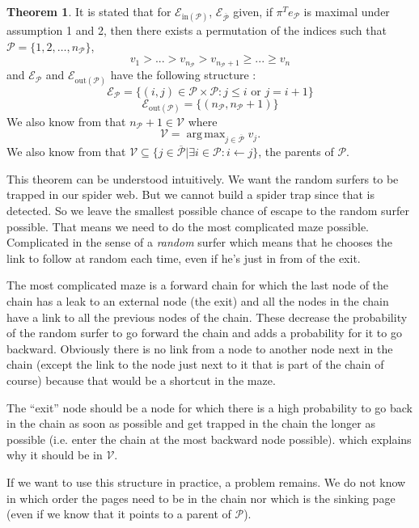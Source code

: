 \documentclass{article}
\DeclareMathOperator*{\argmax}{arg\,max}
\newcommand{\1}{\mathbf{1}}
\theoremstyle{definition}
\newtheorem{mytheo}[mydef]{Theorem}
\begin{document}
\begin{mytheo}
  It is stated that for \(\mathcal{E}_{\text{in}(\mathcal{P})}\), \(\mathcal{E}_{\overline{\mathcal{P}}}\) given, if  \(\pi^T e_{\mathcal{P}}\) is maximal under assumption 1 and 2, then there exists a permutation of the indices such that
\(\mathcal{P} = \{1,2, \hdots, n_{\mathcal{P}}\}\),
\[ v_1 > ... > v_{n_\mathcal{P}}>v_{n_{\mathcal{P}}+1} \geq ... \geq v_n\]
and \(\mathcal{E}_{\mathcal{P}}\) and \(\mathcal{E}_{\text{out}(\mathcal{P})} \) have the following structure :
\[\mathcal{E}_{\mathcal{P}} = \{(i,j) \in \mathcal{P}\times \mathcal{P} : j \leq i \text{ or }j = i+1 \}\]
\[\mathcal{E}_{\text{out}(\mathcal{P})} = \{(n_{\mathcal{P}},n_{\mathcal{P}}+1)\}\]
We also know from \cite{de2008maximizing} that \(n_\mathcal{P}+1 \in \mathcal{V}\) where
\[ \mathcal{V} = \argmax_{j \in \overline{\mathcal{P}}} v_j. \]
We also know from \cite{de2008maximizing} that \(\mathcal{V} \subseteq \{j \in \overline{\mathcal{P}} | \exists i \in \mathcal{P} : i \leftarrow j\}\), the parents of \(\mathcal{P}\).
\label{thm:optstruct}
\end{mytheo}

This theorem can be understood intuitively.
We want the random surfers to be trapped in our spider web.
But we cannot build a spider trap since that is detected.
So we leave the smallest possible chance of escape to the random surfer possible.
That means we need to do the most complicated maze possible.
Complicated in the sense of a \emph{random} surfer which means that he chooses
the link to follow at random each time, even if he's just in from of the exit.

The most complicated maze is a forward chain for which the last node of the chain has a leak to an external node (the exit)
and all the nodes in the chain have a link to all the previous nodes of the chain.
These decrease the probability of the random surfer to go forward the chain and adds a probability for it to go backward.
Obviously there is no link from a node to another node next in the chain (except the link to the node just next to it that is part of the chain of course) because that would be a shortcut in the maze.

The ``exit'' node should be a node for which there is a high probability to go back in the chain as soon as possible and get trapped in the chain the longer as possible (i.e. enter the chain at the most backward node possible).
which explains why it should be in $\mathcal{V}$.

If we want to use this structure in practice, a problem remains.
We do not know in which order the pages need to be in the chain
nor which is the sinking page (even if we know that it points to a parent of \(\mathcal{P}\)).
\end{document}
